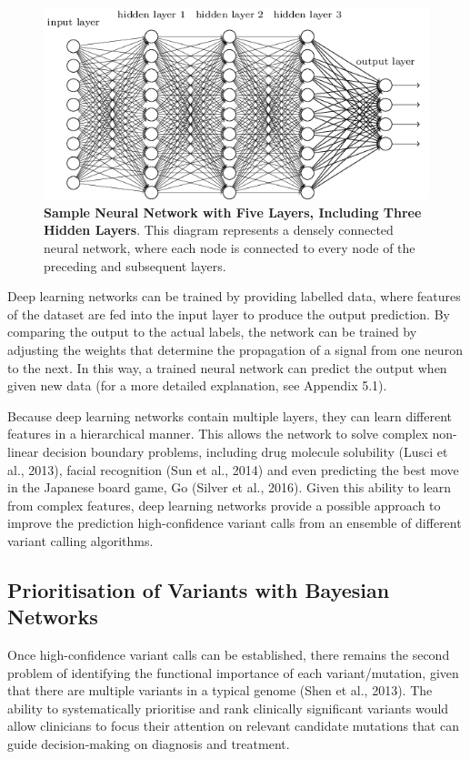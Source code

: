 \documentclass{article}
\begin{document}
\begin{figure}[H]
\includegraphics[width=\textwidth]{neuralnet.png}
\centering
\caption{\textbf{Sample Neural Network with Five Layers, Including Three Hidden Layers}. This diagram represents a densely connected neural network, where each node is connected to every node of the preceding and subsequent layers.}
\end{figure}
Deep learning networks can be trained by providing labelled data, where features of the dataset are fed into the input layer to produce the output prediction. By comparing the output to the actual labels, the network can be trained by adjusting the weights that determine the propagation of a signal from one neuron to the next. In this way, a trained neural network can predict the output when given new data (for a more detailed explanation, see Appendix 5.1).

Because deep learning networks contain multiple layers, they can learn different features in a hierarchical manner. This allows the network to solve complex non-linear decision boundary problems, including drug molecule solubility (Lusci et al., 2013), facial recognition (Sun et al., 2014) and even predicting the best move in the Japanese board game, Go (Silver et al., 2016). Given this ability to learn from complex features, deep learning networks provide a possible approach to improve the prediction high-confidence variant calls from an ensemble of different variant calling algorithms.
 
\subsection{Prioritisation of Variants with Bayesian Networks}
Once high-confidence variant calls can be established, there remains the second problem of identifying the functional importance of each variant/mutation, given that there are multiple variants in a typical genome (Shen et al., 2013). The ability to systematically prioritise and rank clinically significant variants would allow clinicians to focus their attention on relevant candidate mutations that can guide decision-making on diagnosis and treatment.
\end{document}
